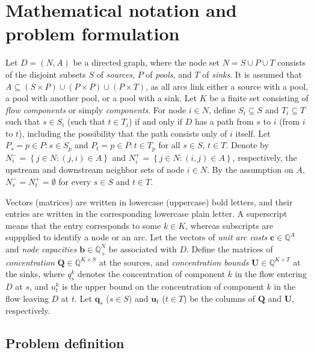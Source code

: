\documentclass[pdflatex,sn-mathphys-num]{sn-jnl}%
\theoremstyle{thmstyleone}%
\begin{document}
\section{Mathematical notation and problem formulation}\label{sec:notation}

Let $D=(N,A)$ be a directed graph,
where the node set $N=S\cup P\cup T$ consists of the disjoint subsets $S$ of \emph{sources}, $P$ of \emph{pools}, and $T$ of \emph{sinks}.
It is assumed that $A\subseteq (S\times P)\cup (P\times P)\cup (P\times T)$,
as all arcs link either a source with a pool, a pool with another pool, or a pool with a sink.
Let $K$ be a finite set consisting of \emph{flow components} or simply \emph{components}.
For node $i\in N$, define $S_i\subseteq S$ and $T_i\subseteq T$ such that $s\in S_i$ (such that $t\in T_i$)
if and only if $D$ has a path from $s$ to $i$ (from $i$ to $t$), including the possibility that the path consists only of $i$ itself.
Let $P_s={p\in P: s\in S_p}$ and $P_t={p\in P: t\in T_p}$ for all $s\in S$, $t\in T$.
Denote by $N_i^-=\left\{j\in N: (j,i)\in A\right\}$ and $N_i^+=\left\{j\in N: (i,j)\in A\right\}$, respectively,
the upstream and downstream neighbor sets of node $i\in N$.
By the assumption on $A$, $N_s^-=N_t^+=\emptyset$ for every $s\in S$ and $t\in T$.

Vectors (matrices) are written in lowercase (uppercase) bold letters,
and their entries are written in the corresponding lowercase plain letter.
A superscript means that the entry corresponds to some $k\in K$, whereas subscripts are suppplied to identify a node or an arc.
Let the vectors of \emph{unit arc costs} $\boldsymbol{c}\in\mathbb{Q}^{A}$ and \emph{node capacities} $\boldsymbol{b}\in\mathbb{Q}_+^{N}$
be associated with $D$.
Define the matrices of \emph{concentration} $\boldsymbol{Q}\in\mathbb{Q}^{K\times S}$ at the sources, and \emph{concentration bounds}
$\boldsymbol{U}\in\mathbb{Q}^{K\times T}$ at the sinks,
where $q_s^k$ denotes the concentration of component $k$ in the flow entering $D$ at $s$,
and $u_t^k$ is the upper bound on the concentration of component $k$ in the flow leaving $D$ at $t$.
Let $\boldsymbol{q}_s$ ($s\in S$) and $\boldsymbol{u}_t$ ($t\in T$) be the columns of $\boldsymbol{Q}$ and $\boldsymbol{U}$, respectively.

\subsection{Problem definition} \label{sec:problem}
\end{document}

